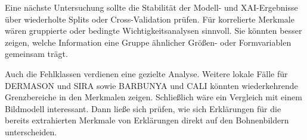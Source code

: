 Eine nächste Untersuchung sollte die Stabilität der Modell- und XAI-Ergebnisse über wiederholte Splits oder Cross-Validation prüfen. Für korrelierte Merkmale wären gruppierte oder bedingte Wichtigkeitsanalysen sinnvoll. Sie könnten besser zeigen, welche Information eine Gruppe ähnlicher Größen- oder Formvariablen gemeinsam trägt.

Auch die Fehlklassen verdienen eine gezielte Analyse. Weitere lokale Fälle für DERMASON und SIRA sowie BARBUNYA und CALI könnten wiederkehrende Grenzbereiche in den Merkmalen zeigen. Schließlich wäre ein Vergleich mit einem Bildmodell interessant. Dann ließe sich prüfen, wie sich Erklärungen für die bereits extrahierten Merkmale von Erklärungen direkt auf den Bohnenbildern unterscheiden.
